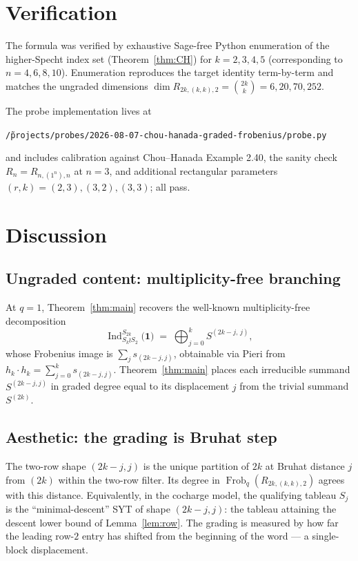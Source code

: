 \documentclass[11pt]{article}
\theoremstyle{definition}
\theoremstyle{remark}
\DeclareMathOperator{\Frob}{Frob}
\DeclareMathOperator{\Ind}{Ind}
\begin{document}
\section{Verification}

The formula was verified by exhaustive Sage-free Python enumeration of the
higher-Specht index set (Theorem~\ref{thm:CH}) for $k = 2, 3, 4, 5$
(corresponding to $n = 4, 6, 8, 10$). Enumeration reproduces the target
identity term-by-term and matches the ungraded dimensions
$\dim R_{2k,(k,k),2} = \binom{2k}{k} = 6, 20, 70, 252$.

The probe implementation lives at
\begin{center}
\texttt{\~/projects/probes/2026-08-07-chou-hanada-graded-frobenius/probe.py}
\end{center}
and includes calibration against Chou--Hanada Example 2.40, the sanity check
$R_n = R_{n,(1^n),n}$ at $n = 3$, and additional rectangular parameters
$(r,k) = (2,3),(3,2),(3,3)$; all pass.

\section{Discussion}

\subsection*{Ungraded content: multiplicity-free branching}

At $q = 1$, Theorem~\ref{thm:main} recovers the well-known
multiplicity-free decomposition
\[
    \Ind_{S_k \wr S_2}^{S_{2k}}\bigl(\mathbf 1\bigr)
    \;=\; \bigoplus_{j=0}^{k} S^{(2k-j,\,j)},
\]
whose Frobenius image is $\sum_j s_{(2k-j,j)}$, obtainable via Pieri from
$h_k \cdot h_k = \sum_{j=0}^k s_{(2k-j,j)}$. Theorem~\ref{thm:main} places
each irreducible summand $S^{(2k-j,j)}$ in graded degree equal to its
displacement $j$ from the trivial summand $S^{(2k)}$.

\subsection*{Aesthetic: the grading is Bruhat step}

The two-row shape $(2k-j, j)$ is the unique partition of $2k$ at Bruhat
distance $j$ from $(2k)$ within the two-row filter. Its degree in
$\Frob_q(R_{2k,(k,k),2})$ agrees with this distance. Equivalently, in the
cocharge model, the qualifying tableau $S_j$ is the ``minimal-descent'' SYT
of shape $(2k-j, j)$: the tableau attaining the descent lower bound of
Lemma~\ref{lem:row}. The grading is measured by how far the leading row-$2$
entry has shifted from the beginning of the word --- a single-block
displacement.
\end{document}
